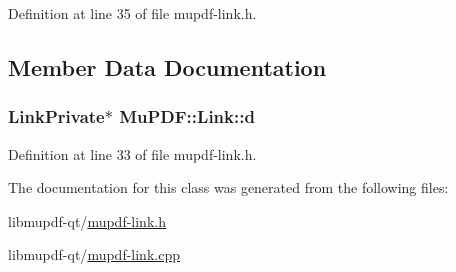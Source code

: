 Definition at line 35 of file mupdf-\/link.\-h.



\subsection{Member Data Documentation}
\hypertarget{class_mu_p_d_f_1_1_link_a5723c1b46286b89fd7a8fccfa3dc05d2}{
\subsubsection[{d}]{\setlength{\rightskip}{0pt plus 5cm}Link\-Private$\ast$ Mu\-P\-D\-F\-::\-Link\-::d\hspace{0.3cm}{\ttfamily [protected]}}}\label{class_mu_p_d_f_1_1_link_a5723c1b46286b89fd7a8fccfa3dc05d2}


Definition at line 33 of file mupdf-\/link.\-h.



The documentation for this class was generated from the following files\-:\begin{DoxyCompactItemize}
\item 
libmupdf-\/qt/\hyperlink{mupdf-link_8h}{mupdf-\/link.\-h}\item 
libmupdf-\/qt/\hyperlink{mupdf-link_8cpp}{mupdf-\/link.\-cpp}\end{DoxyCompactItemize}
